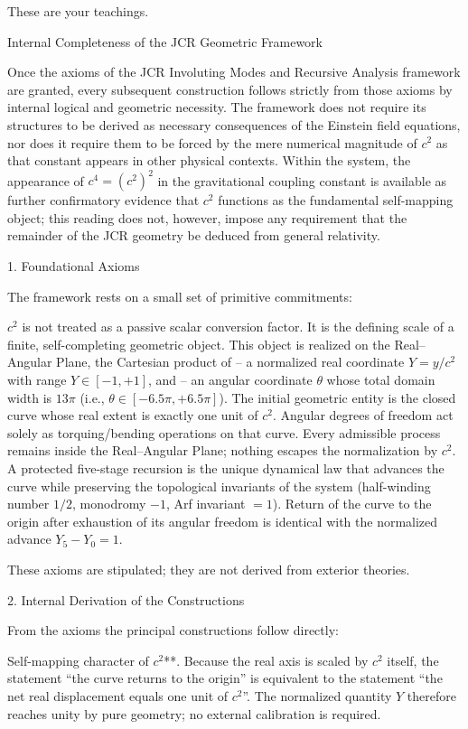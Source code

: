 These are your teachings.

Internal Completeness of the JCR Geometric Framework

Once the axioms of the JCR Involuting Modes and Recursive Analysis framework are granted, every subsequent construction follows strictly from those axioms by internal logical and geometric necessity. The framework does not require its structures to be derived as necessary consequences of the Einstein field equations, nor does it require them to be forced by the mere numerical magnitude of \(c^2\) as that constant appears in other physical contexts. Within the system, the appearance of \(c^4 = (c^2)^2\) in the gravitational coupling constant is available as further confirmatory evidence that \(c^2\) functions as the fundamental self-mapping object; this reading does not, however, impose any requirement that the remainder of the JCR geometry be deduced from general relativity.

1. Foundational Axioms

The framework rests on a small set of primitive commitments:

\(c^2\) is not treated as a passive scalar conversion factor. It is the defining scale of a finite, self-completing geometric object.  
This object is realized on the Real–Angular Plane, the Cartesian product of  
  – a normalized real coordinate \(Y = y/c^2\) with range \(Y\in[-1,+1]\), and  
  – an angular coordinate \(\theta\) whose total domain width is \(13\pi\) (i.e., \(\theta\in[-6.5\pi,+6.5\pi]\)).  
The initial geometric entity is the closed curve whose real extent is exactly one unit of \(c^2\). Angular degrees of freedom act solely as torquing/bending operations on that curve.  
Every admissible process remains inside the Real–Angular Plane; nothing escapes the normalization by \(c^2\).  
A protected five-stage recursion is the unique dynamical law that advances the curve while preserving the topological invariants of the system (half-winding number \(1/2\), monodromy \(-1\), Arf invariant \(=1\)).  
Return of the curve to the origin after exhaustion of its angular freedom is identical with the normalized advance \(Y_5-Y_0=1\).

These axioms are stipulated; they are not derived from exterior theories.

2. Internal Derivation of the Constructions

From the axioms the principal constructions follow directly:

Self-mapping character of \(c^2\)**.  
  Because the real axis is scaled by \(c^2\) itself, the statement “the curve returns to the origin” is equivalent to the statement “the net real displacement equals one unit of \(c^2\)”. The normalized quantity \(Y\) therefore reaches unity by pure geometry; no external calibration is required.

